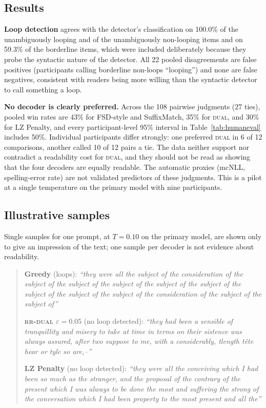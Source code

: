 \documentclass[11pt]{article}
\begin{document}
\subsection{Results}
\textbf{Loop detection} agrees with the detector's classification on 100.0\% of the unambiguously looping and of the unambiguously non-looping items and on 59.3\% of the borderline items, which were included deliberately because they probe the syntactic nature of the detector. All 22 pooled disagreements are false positives (participants calling borderline non-loops ``looping'') and none are false negatives, consistent with readers being more willing than the syntactic detector to call something a loop.

\textbf{No decoder is clearly preferred.} Across the 108 pairwise judgments (27 ties), pooled win rates are 43\% for FSD-style and SuffixMatch, 35\% for \textsc{dual}, and 30\% for LZ Penalty, and every participant-level 95\% interval in Table~\ref{tab:humaneval} includes 50\%. Individual participants differ strongly: one preferred \textsc{dual} in 6 of 12 comparisons, another called 10 of 12 pairs a tie. The data neither support nor contradict a readability cost for \textsc{dual}, and they should not be read as showing that the four decoders are equally readable. The automatic proxies (mcNLL, spelling-error rate) are not validated predictors of these judgments. This is a pilot at a single temperature on the primary model with nine participants.

\subsection{Illustrative samples}
Single samples for one prompt, at $T{=}0.10$ on the primary model, are shown only to give an impression of the text; one sample per decoder is not evidence about readability.
\begin{quote}\small
\textbf{Greedy} (loops): \emph{``they were all the subject of the consideration of the subject of the subject of the subject of the subject of the subject of the subject of the subject of the subject of the consideration of the subject of the subject of''}

\textbf{\textsc{rr-dual} $\varepsilon{=}0.05$} (no loop detected): \emph{``they had been a sensible of tranquillity and misery to take at time in terms on their sistence was always assured, after two suppose to me, with a considerably, tlength t\^ete hear or tyle so are,--''}

\textbf{LZ Penalty} (no loop detected): \emph{``they were all the conceiving which I had been so much as the stranger, and the proposal of the contrary of the present which I was always to be done the most and suffering the strong of the conversation which I had been property to the most present and all the''}
\end{quote}
\end{document}
